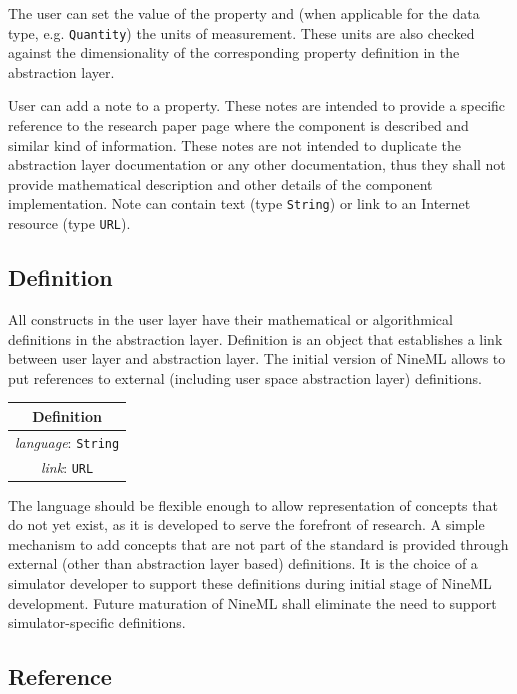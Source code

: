 \documentclass{article}
\begin{document}
The user can set the value of the property and (when applicable for the data
type, e.g. {\tt Quantity}) the units of measurement. These units are also
checked against the dimensionality of the corresponding property definition
in the abstraction layer.

User can add a note to a property. These notes are
intended to provide a specific reference to the research paper page
where the component is described and similar kind of information. These
notes are not intended to duplicate the abstraction layer documentation
or any other documentation, thus they shall not provide mathematical
description and other details of the component implementation. Note can
contain text (type {\tt String}) or link to an Internet resource (type
{\tt URL}).

\subsection{Definition}

All constructs in the user layer have their mathematical or algorithmical
definitions in the abstraction layer. Definition is an object that
establishes a link between user layer and abstraction layer. The initial
version of NineML allows to put references to external (including user
space abstraction layer) definitions.

\begin{table}[htb]
\center
\begin{tabular}{|c|}
\hline
\hline
Definition \\
\hline
\hline
{\em language}: {\tt String} \\
\hline
{\em link}: {\tt URL}\\
\hline
\end{tabular}
\end{table}

The language should be flexible enough to allow representation of concepts
that do not yet exist, as it is developed to serve the forefront of research.
A simple mechanism to add concepts that are not part of the standard is
provided through external (other than abstraction layer based) definitions.
It is the choice of a simulator developer to support these definitions during
initial stage of NineML development. Future
maturation of NineML shall eliminate the need to support simulator-specific
definitions.

\subsection{Reference}
\end{document}
